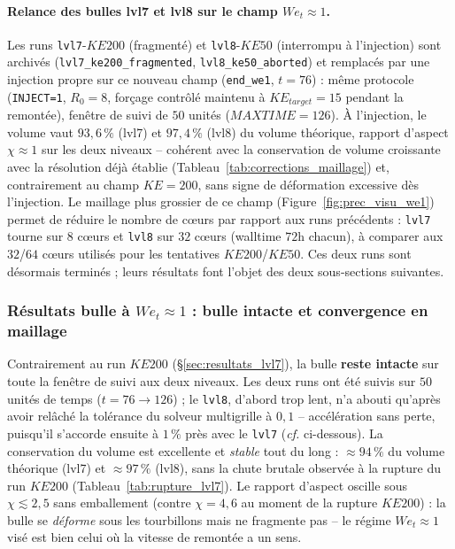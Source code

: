 \paragraph{Relance des bulles lvl7 et lvl8 sur le champ $We_t \approx 1$.} Les runs
\texttt{lvl7}-$KE200$ (fragmenté) et \texttt{lvl8}-$KE50$ (interrompu à l'injection)
sont archivés (\texttt{lvl7\_ke200\_fragmented}, \texttt{lvl8\_ke50\_aborted}) et
remplacés par une injection propre sur ce nouveau champ (\texttt{end\_we1}, $t=76$) :
même protocole (\texttt{INJECT=1}, $R_0=8$, forçage contrôlé maintenu à
$KE_{target}=15$ pendant la remontée), fenêtre de suivi de $50$ unités
($MAXTIME=126$). À l'injection, le volume vaut $93{,}6\,\%$ (lvl7) et $97{,}4\,\%$
(lvl8) du volume théorique, rapport d'aspect $\chi \approx 1$ sur les deux niveaux --
cohérent avec la conservation de volume croissante avec la résolution déjà établie
(Tableau~\ref{tab:corrections_maillage}) et, contrairement au champ $KE=200$, sans
signe de déformation excessive dès l'injection. Le maillage plus grossier de ce
champ (Figure~\ref{fig:prec_visu_we1}) permet de réduire le nombre de cœurs par
rapport aux runs précédents : \texttt{lvl7} tourne sur $8$ cœurs et \texttt{lvl8}
sur $32$ cœurs (walltime $72$h chacun), à comparer aux $32$/$64$ cœurs utilisés pour
les tentatives $KE200$/$KE50$. Ces deux runs sont désormais terminés ; leurs
résultats font l'objet des deux sous-sections suivantes.

\subsubsection{Résultats bulle à $We_t \approx 1$ : bulle intacte et convergence
en maillage}
\label{sec:resultats_we1}

Contrairement au run $KE200$ (\S\ref{sec:resultats_lvl7}), la bulle \textbf{reste
intacte} sur toute la fenêtre de suivi aux deux niveaux. Les deux runs ont été
suivis sur $50$ unités de temps ($t=76 \to 126$) ; le \texttt{lvl8}, d'abord trop
lent, n'a abouti qu'après avoir relâché la tolérance du solveur multigrille à
$0{,}1$ -- accélération sans perte, puisqu'il s'accorde ensuite à $1\,\%$ près avec
le \texttt{lvl7} (\emph{cf.} ci-dessous). La conservation du volume est excellente et \emph{stable}
tout du long : $\approx 94\,\%$ du volume théorique (lvl7) et $\approx 97\,\%$
(lvl8), sans la chute brutale observée à la rupture du run $KE200$
(Tableau~\ref{tab:rupture_lvl7}). Le rapport d'aspect oscille sous
$\chi \lesssim 2{,}5$ sans emballement (contre $\chi = 4{,}6$ au moment de la
rupture $KE200$) : la bulle se \emph{déforme} sous les tourbillons mais ne
fragmente pas -- le régime $We_t \approx 1$ visé est bien celui où la vitesse de
remontée a un sens.

